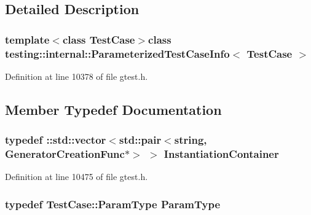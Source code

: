 \subsection{\-Detailed \-Description}
\subsubsection*{template$<$class \-Test\-Case$>$class testing\-::internal\-::\-Parameterized\-Test\-Case\-Info$<$ Test\-Case $>$}



\-Definition at line 10378 of file gtest.\-h.



\subsection{\-Member \-Typedef \-Documentation}
\hypertarget{classtesting_1_1internal_1_1ParameterizedTestCaseInfo_a555ba546b062205df53faaad1561626f}{
\subsubsection[{\-Instantiation\-Container}]{\setlength{\rightskip}{0pt plus 5cm}typedef \-::std\-::vector$<$std\-::pair$<${\bf string}, \-Generator\-Creation\-Func$\ast$$>$ $>$ {\bf \-Instantiation\-Container}}}\label{d0/d69/classtesting_1_1internal_1_1ParameterizedTestCaseInfo_a555ba546b062205df53faaad1561626f}


\-Definition at line 10475 of file gtest.\-h.

\hypertarget{classtesting_1_1internal_1_1ParameterizedTestCaseInfo_ab50f5599aaeeb72dd821ed2d71ad8e35}{
\subsubsection[{\-Param\-Type}]{\setlength{\rightskip}{0pt plus 5cm}typedef \-Test\-Case\-::\-Param\-Type {\bf \-Param\-Type}}}\label{d0/d69/classtesting_1_1internal_1_1ParameterizedTestCaseInfo_ab50f5599aaeeb72dd821ed2d71ad8e35}


